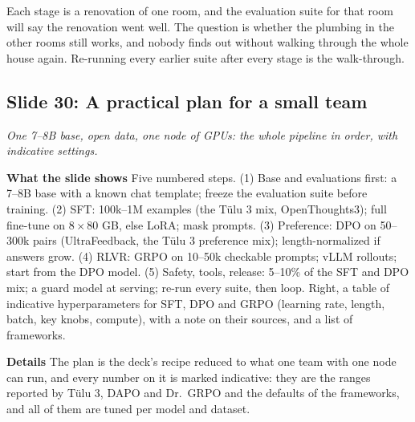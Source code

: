 \documentclass[11pt,letterpaper]{article}
\newcommand{\slide}[3]{%
  \subsection[Slide #1: #2]{Slide #1: #2}%
  {\color{muted}\itshape #3\par}\medskip}
\newcommand{\para}[1]{\medskip\noindent\textbf{#1}\quad}
\newenvironment{intuition}{\begin{tcolorbox}[intuitionbox]}{\end{tcolorbox}}
\begin{document}
\begin{intuition}
Each stage is a renovation of one room, and the evaluation suite for that room will say the renovation went well. The question is whether the plumbing in the other rooms still works, and nobody finds out without walking through the whole house again. Re-running every earlier suite after every stage is the walk-through.
\end{intuition}

\slide{30}{A practical plan for a small team}{One 7--8B base, open data, one node of GPUs: the whole pipeline in order, with indicative settings.}

\para{What the slide shows} Five numbered steps. (1) Base and evaluations first: a 7--8B base with a known chat template; freeze the evaluation suite before training. (2) SFT: 100k--1M examples (the Tülu 3 mix, OpenThoughts3); full fine-tune on $8\times80$ GB, else LoRA; mask prompts. (3) Preference: DPO on 50--300k pairs (UltraFeedback, the Tülu 3 preference mix); length-normalized if answers grow. (4) RLVR: GRPO on 10--50k checkable prompts; vLLM rollouts; start from the DPO model. (5) Safety, tools, release: 5--10\% of the SFT and DPO mix; a guard model at serving; re-run every suite, then loop. Right, a table of indicative hyperparameters for SFT, DPO and GRPO (learning rate, length, batch, key knobs, compute), with a note on their sources, and a list of frameworks.

\para{Details} The plan is the deck's recipe reduced to what one team with one node can run, and every number on it is marked indicative: they are the ranges reported by Tülu 3, DAPO and Dr.\ GRPO and the defaults of the frameworks, and all of them are tuned per model and dataset.
\end{document}
